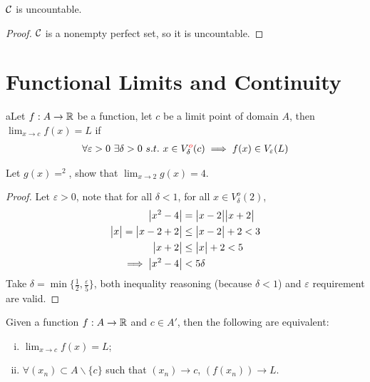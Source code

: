 \documentclass[11pt]{article}
\begin{document}
	\begin{proposition}
		$\mathcal{{C}}$ is uncountable.
	\end{proposition}
	
	\begin{proof}
		$\mathcal{{C}}$ is a nonempty perfect set, so it is uncountable.
	\end{proof}
	
	\section{Functional Limits and Continuity}
	\begin{definition}
		aLet $f: A \to \mathbb{R}$ be a function, let $c$ be a limit point of domain $A$, then $\lim_{x \to c} f(x) = L$ if 
		\begin{align}
			\forall \varepsilon > 0\ \exists \delta > 0\ s.t.\ x \in V_\delta^{\textcolor{red}{o}} (c) \implies f(x) \in V_\varepsilon(L)
		\end{align}
	\end{definition}
	
	\begin{example}
		Let $g(x) = ^2$, show that $\lim_{x \to 2} g(x) = 4$.
		\begin{proof}
			Let $\varepsilon > 0$, note that for all $\delta < 1$, for all $x \in V_\delta^o(2)$,
			\begin{align}
				\big \vert {x^2 - 4} \big \vert &= \big \vert {x-2} \big \vert \big \vert {x+2} \big \vert \\
				\big \vert {x} \big \vert = \big \vert {x-2+2} \big \vert &\leq \big \vert {x-2} \big \vert + 2 < 3 \\
				\big \vert {x+2} \big \vert &\leq \big \vert {x} \big \vert + 2 < 5 \\
				\implies \big \vert {x^2-4} \big \vert &< 5 \delta
			\end{align}
			Take $\delta = \min\{\frac{1}{2}, \frac{\varepsilon}{5}\}$, both inequality reasoning (because $\delta < 1$) and $\varepsilon$ requirement are valid.
		\end{proof}
	\end{example}
	
	\begin{theorem}
		Given a function $f: A \to \mathbb{R}$ and $c \in A'$, then the following are equivalent:
		\begin{enumerate}[(i)]
			\item $\lim_{x \to c} f(x) = L$;
			\item $\forall (x_n) \subset A \backslash \{c\}$ such that $(x_n) \to c$, $(f(x_n)) \to L$.
		\end{enumerate}
	\end{theorem}
	
\end{document}
